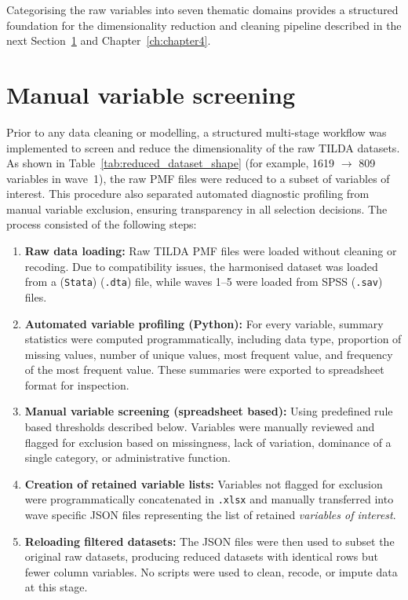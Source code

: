 Categorising the raw variables into seven thematic domains provides a structured foundation for the dimensionality reduction and cleaning pipeline described in the next Section~\ref{sc:manual_var_filtering} and Chapter~\ref{ch:chapter4}.

\section{Manual variable screening}\label{sc:manual_var_filtering}
Prior to any data cleaning or modelling, a structured multi-stage workflow was implemented to screen and reduce the dimensionality of the raw \gls{TILDA} datasets. As shown in Table~\ref{tab:reduced_dataset_shape} (for example, 1619 $\to$ 809 variables in wave~1), the raw \gls{PMF} files were reduced to a subset of variables of interest. This procedure also separated automated diagnostic profiling from manual variable exclusion, ensuring transparency in all selection decisions. The process consisted of the following steps:
\begin{enumerate}
    \item \textbf{Raw data loading:} Raw \gls{TILDA} \gls{PMF} files were loaded without cleaning or recoding. Due to compatibility issues, the harmonised dataset was loaded from a (\texttt{Stata}) (\texttt{.dta}) file, while waves 1--5 were loaded from \gls{SPSS} (\texttt{.sav}) files.
    \item \textbf{Automated variable profiling (Python):} For every variable, summary statistics were computed programmatically, including data type, proportion of missing values, number of unique values, most frequent value, and frequency of the most frequent value. These summaries were exported to spreadsheet format for inspection.
    \item \textbf{Manual variable screening (spreadsheet based):} Using predefined rule based thresholds described below. Variables were manually reviewed and flagged for exclusion based on missingness, lack of variation, dominance of a single category, or administrative function.
    \item \textbf{Creation of retained variable lists:} Variables not flagged for exclusion were programmatically concatenated in \texttt{.xlsx} and manually transferred into wave specific \gls{JSON} files representing the list of retained \emph{variables of interest}.
    \item \textbf{Reloading filtered datasets:} The \gls{JSON} files were then used to subset the original raw datasets, producing reduced datasets with identical rows but fewer column variables. No scripts were used to clean, recode, or impute data at this stage.
\end{enumerate}

